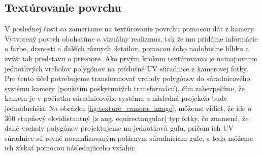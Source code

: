 \subsection{Textúrovanie povrchu}
\noindent V poslednej časti sa zameriame na textúrovanie povrchu pomocou dát z kamery. Vytvorený povrch obohatíme o vizuálny realizmus, tak že mu pridáme informácie o farbe, drsnosti a ďalších rôznych detailov, pomocou čoho nadobudne hĺbku a zvýši tak predstavu o priestore.
\newline\indent Ako prvým krokom textúrovania je namapovanie jednotlivých vrcholov polygónov na príslušné UV súradnice z kamerovej fotky. Pre tento účel potrebujeme transformovať vrcholy polygónov do súradnicového systému kamery (použitím poskytnutých transformácií), čím zabezpečíme, že kamera je v počiatku súradnicového systému a následná projekcia bude jednoduchšia. Na obrázku \ref{fig:texture_camera_image}, môžeme vidieť, že ide o 360 stupňový ekvidistantný (z ang. equirectangular) typ fotky, čo znamená, že dané vrcholy polygónov projektujeme na jednotkovú guľu, pričom ich UV súradnice sú rovné normalizovaným polárnym súradniciam gule, a teda môžeme ich získať pomocou následujúceho vzťahu:

